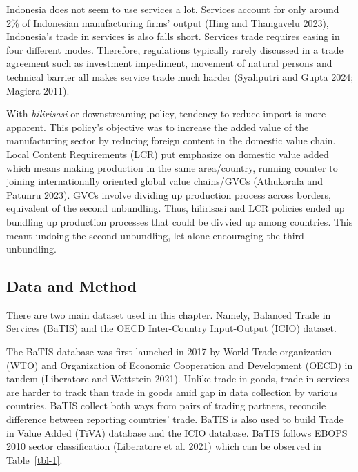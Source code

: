 \documentclass[
  letterpaper,
  DIV=11,
  numbers=noendperiod]{scrartcl}
\begin{document}
Indonesia does not seem to use services a lot. Services account for only
around 2\% of Indonesian manufacturing firms' output (Hing and
Thangavelu 2023), Indonesia's trade in services is also falls short.
Services trade requires easing in four different modes. Therefore,
regulations typically rarely discussed in a trade agreement such as
investment impediment, movement of natural persons and technical barrier
all makes service trade much harder (Syahputri and Gupta 2024; Magiera
2011).

With \emph{hilirisasi} or downstreaming policy, tendency to reduce
import is more apparent. This policy's objective was to increase the
added value of the manufacturing sector by reducing foreign content in
the domestic value chain. Local Content Requirements (LCR) put emphasize
on domestic value added which means making production in the same
area/country, running counter to joining internationally oriented global
value chains/GVCs (Athukorala and Patunru 2023). GVCs involve dividing
up production process across borders, equivalent of the second
unbundling. Thus, hilirisasi and LCR policies ended up bundling up
production processes that could be divvied up among countries. This
meant undoing the second unbundling, let alone encouraging the third
unbundling.

\subsection{Data and Method}\label{data-and-method}

There are two main dataset used in this chapter. Namely, Balanced Trade
in Services (BaTIS) and the OECD Inter-Country Input-Output (ICIO)
dataset.

The BaTIS database was first launched in 2017 by World Trade
organization (WTO) and Organization of Economic Cooperation and
Development (OECD) in tandem (Liberatore and Wettstein 2021). Unlike
trade in goods, trade in services are harder to track than trade in
goods amid gap in data collection by various countries. BaTIS collect
both ways from pairs of trading partners, reconcile difference between
reporting countries' trade. BaTIS is also used to build Trade in Value
Added (TiVA) database and the ICIO database. BaTIS follows EBOPS 2010
sector classification (Liberatore et al. 2021) which can be observed in
Table~\ref{tbl-1}.
\end{document}
